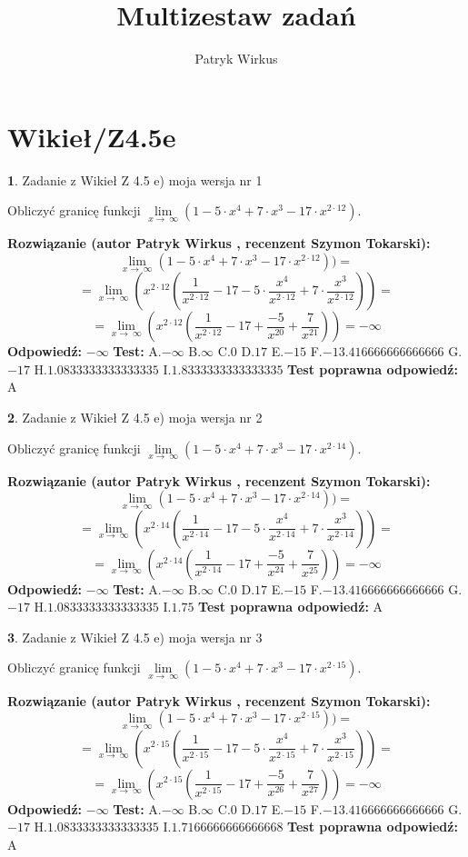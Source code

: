 \documentclass[12pt, a4paper]{article}
\title{Multizestaw zadań}
\author{Patryk Wirkus}
\date{}
\theoremstyle{definition} %
\newtheorem{zad}{}
\newcommand{\kategoria}[1]{\section{#1}}
\newcommand{\zadStart}[1]{\begin{zad}#1\newline}
\newcommand{\zadStop}{\end{zad}}
\newcommand{\rozwStart}[2]{\noindent \textbf{Rozwiązanie (autor #1 , recenzent #2): }\newline}
\newcommand{\rozwStop}{\newline}
\newcommand{\odpStart}{\noindent \textbf{Odpowiedź:}\newline}
\newcommand{\odpStop}{\newline}
\newcommand{\testStart}{\noindent \textbf{Test:}\newline}
\newcommand{\testStop}{\newline}
\newcommand{\kluczStart}{\noindent \textbf{Test poprawna odpowiedź:}\newline}
\newcommand{\kluczStop}{\newline}
\begin{document}
\maketitle

\kategoria{Wikieł/Z4.5e}


\zadStart{Zadanie z Wikieł Z 4.5 e) moja wersja nr 1}


Obliczyć granicę funkcji  $\lim\limits_{x\to\ \infty}(1 - 5 \cdot x^{4}+7 \cdot x^{3}- 17 \cdot x^{2\cdot12})$.
\zadStop
\rozwStart{Patryk Wirkus}{Szymon Tokarski}
$$\lim\limits_{x\to\ \infty}(1 - 5 \cdot x^{4}+7 \cdot x^{3}- 17 \cdot x^{2\cdot12}))=$$
$$=\lim\limits_{x\to\ \infty}(x^{2\cdot12}(\frac{1}{x^{2\cdot12}}-17 -5 \cdot \frac{x^{4}}{x^{2\cdot12}}+7 \cdot \frac{x^{3}}{x^{2\cdot12}}))=$$
$$=\lim\limits_{x\to\ \infty}(x^{2\cdot12}(\frac{1}{x^{2\cdot12}}-17 + \frac{-5}{x^{20}}+ \frac{7}{x^{21}}))=-\infty$$
\rozwStop
\odpStart
$-\infty$
\odpStop
\testStart
A.$-\infty$ B.$\infty$ C.$0$ D.$17$ E.$-15$
F.$-13.416666666666666$ G.$-17$
H.$1.0833333333333335$
I.$1.8333333333333335$
\testStop
\kluczStart
A
\kluczStop



\zadStart{Zadanie z Wikieł Z 4.5 e) moja wersja nr 2}


Obliczyć granicę funkcji  $\lim\limits_{x\to\ \infty}(1 - 5 \cdot x^{4}+7 \cdot x^{3}- 17 \cdot x^{2\cdot14})$.
\zadStop
\rozwStart{Patryk Wirkus}{Szymon Tokarski}
$$\lim\limits_{x\to\ \infty}(1 - 5 \cdot x^{4}+7 \cdot x^{3}- 17 \cdot x^{2\cdot14}))=$$
$$=\lim\limits_{x\to\ \infty}(x^{2\cdot14}(\frac{1}{x^{2\cdot14}}-17 -5 \cdot \frac{x^{4}}{x^{2\cdot14}}+7 \cdot \frac{x^{3}}{x^{2\cdot14}}))=$$
$$=\lim\limits_{x\to\ \infty}(x^{2\cdot14}(\frac{1}{x^{2\cdot14}}-17 + \frac{-5}{x^{24}}+ \frac{7}{x^{25}}))=-\infty$$
\rozwStop
\odpStart
$-\infty$
\odpStop
\testStart
A.$-\infty$ B.$\infty$ C.$0$ D.$17$ E.$-15$
F.$-13.416666666666666$ G.$-17$
H.$1.0833333333333335$
I.$1.75$
\testStop
\kluczStart
A
\kluczStop



\zadStart{Zadanie z Wikieł Z 4.5 e) moja wersja nr 3}


Obliczyć granicę funkcji  $\lim\limits_{x\to\ \infty}(1 - 5 \cdot x^{4}+7 \cdot x^{3}- 17 \cdot x^{2\cdot15})$.
\zadStop
\rozwStart{Patryk Wirkus}{Szymon Tokarski}
$$\lim\limits_{x\to\ \infty}(1 - 5 \cdot x^{4}+7 \cdot x^{3}- 17 \cdot x^{2\cdot15}))=$$
$$=\lim\limits_{x\to\ \infty}(x^{2\cdot15}(\frac{1}{x^{2\cdot15}}-17 -5 \cdot \frac{x^{4}}{x^{2\cdot15}}+7 \cdot \frac{x^{3}}{x^{2\cdot15}}))=$$
$$=\lim\limits_{x\to\ \infty}(x^{2\cdot15}(\frac{1}{x^{2\cdot15}}-17 + \frac{-5}{x^{26}}+ \frac{7}{x^{27}}))=-\infty$$
\rozwStop
\odpStart
$-\infty$
\odpStop
\testStart
A.$-\infty$ B.$\infty$ C.$0$ D.$17$ E.$-15$
F.$-13.416666666666666$ G.$-17$
H.$1.0833333333333335$
I.$1.7166666666666668$
\testStop
\kluczStart
A
\kluczStop
\end{document}
